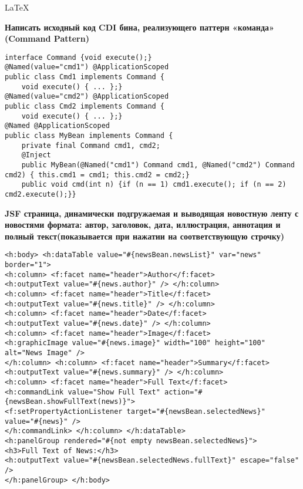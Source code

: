 \documentclass{article}
\begin{document}
\begin{center}
    \LaTeX
\end{center}
\tiny


\begin{minipage}[t]{0.3\textwidth}
    \textbf{Написать исходный код CDI бина, реализующего паттерн «команда» (Command Pattern)}
    \begin{lstlisting}[frame=single, basicstyle=\tiny\ttfamily, breaklines=true, breakatwhitespace=true, postbreak=\mbox{\textcolor{red}{$\hookrightarrow$}\space}]
interface Command {void execute();}
@Named(value="cmd1") @ApplicationScoped
public class Cmd1 implements Command {
    void execute() { ... };}
@Named(value="cmd2") @ApplicationScoped
public class Cmd2 implements Command {
    void execute() { ... };}
@Named @ApplicationScoped
public class MyBean implements Command {
    private final Command cmd1, cmd2;
    @Inject
    public MyBean(@Named("cmd1") Command cmd1, @Named("cmd2") Command cmd2) { this.cmd1 = cmd1; this.cmd2 = cmd2;}
    public void cmd(int n) {if (n == 1) cmd1.execute(); if (n == 2) cmd2.execute();}}
    \end{lstlisting}
\end{minipage}%
\hfill
\begin{minipage}[t]{0.3\textwidth}
    \textbf{JSF страница, динамически подгружаемая и выводящая новостную ленту с новостями формата: автор, заголовок, дата, иллюстрация, аннотация и полный текст(показывается при нажатии на соответствующую строчку)}
    \begin{lstlisting}[frame=single, basicstyle=\tiny\ttfamily, breaklines=true, breakatwhitespace=true, postbreak=\mbox{\textcolor{red}{$\hookrightarrow$}\space}]
<h:body> <h:dataTable value="#{newsBean.newsList}" var="news" border="1">
<h:column> <f:facet name="header">Author</f:facet>
<h:outputText value="#{news.author}" /> </h:column>
<h:column> <f:facet name="header">Title</f:facet>
<h:outputText value="#{news.title}" /> </h:column>
<h:column> <f:facet name="header">Date</f:facet>
<h:outputText value="#{news.date}" /> </h:column>
<h:column> <f:facet name="header">Image</f:facet>
<h:graphicImage value="#{news.image}" width="100" height="100" alt="News Image" />
</h:column> <h:column> <f:facet name="header">Summary</f:facet>
<h:outputText value="#{news.summary}" /> </h:column>
<h:column> <f:facet name="header">Full Text</f:facet>
<h:commandLink value="Show Full Text" action="#{newsBean.showFullText(news)}">
<f:setPropertyActionListener target="#{newsBean.selectedNews}" value="#{news}" />
</h:commandLink> </h:column> </h:dataTable>
<h:panelGroup rendered="#{not empty newsBean.selectedNews}">
<h3>Full Text of News:</h3>
<h:outputText value="#{newsBean.selectedNews.fullText}" escape="false" />
</h:panelGroup> </h:body>
    \end{lstlisting}
\end{minipage}%
\end{document}
